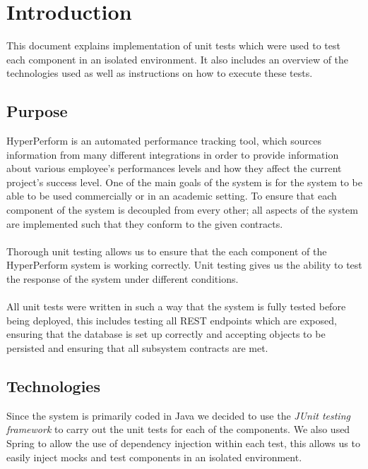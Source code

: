 \documentclass[11pt,a4paper]{article}
\begin{document}
	\thispagestyle{empty}
	\pagebreak
	
	\tableofcontents
	\pagebreak

\section{Introduction}

This document explains implementation of unit tests which were used to test each component in an isolated environment. It also includes an overview of the technologies used as well as instructions on how to execute these tests. \\ 

\subsection{Purpose}
HyperPerform is an automated performance tracking tool, which sources information from many different integrations in order to provide information about various employee's performances levels and how they affect the current project's success level. One of the main goals of the system is for the system to be able to be used commercially or in an academic setting. To ensure that each component of the system is decoupled from every other; all aspects of the system are implemented such that they conform to the given contracts. \\ \\
Thorough unit testing allows us to ensure that the each component of the HyperPerform system is working correctly. Unit testing gives us the ability to test the response of the system under different conditions. \\ \\
All unit tests were written in such a way that the system is fully tested before being deployed, this includes testing all REST endpoints which are exposed, ensuring that the database is set up correctly and accepting objects to be persisted and ensuring that all subsystem contracts are met.

\subsection{Technologies}

Since the system is primarily coded in Java we decided to use the \textit{JUnit testing framework} to carry out the unit tests for each of the components. We also used Spring to allow the use of dependency injection within each test, this allows us to easily inject mocks and test components in an isolated environment. \\
\end{document}
